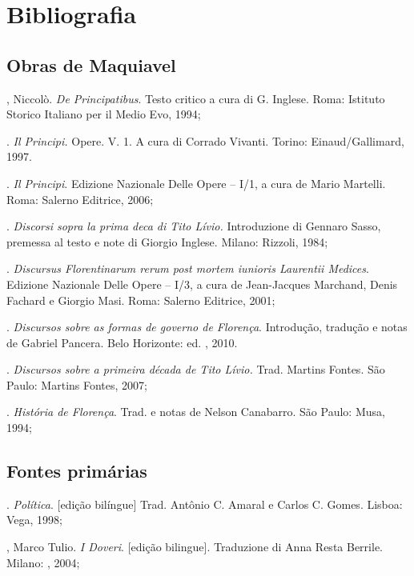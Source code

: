 \movetooddpage
{}
\chapter*{Bibliografia}

\begin{bibliohedra}
\section*{Obras de Maquiavel}

, Niccolò. \emph{De Principatibus}. Testo critico a cura di
G. Inglese. Roma: Istituto Storico Italiano per il Medio Evo, 1994;

\titidem. \emph{Il Principi.} Opere. V. 1. A cura di Corrado
Vivanti. Torino: Einaud/Gallimard, 1997.

\titidem. \emph{Il Principi}. Edizione Nazionale Delle Opere
-- I/1, a cura de Mario Martelli. Roma: Salerno Editrice, 2006;

\titidem. \emph{Discorsi sopra la prima deca di Tito Lívio.}
Introduzione di Gennaro Sasso, premessa al testo e note di Giorgio
Inglese. Milano: Rizzoli, 1984;

\titidem. \emph{Discursus Florentinarum rerum post mortem
iunioris Laurentii Medices}. Edizione Nazionale Delle Opere -- I/3, a
cura de Jean-Jacques Marchand, Denis Fachard e Giorgio Masi. Roma:
Salerno Editrice, 2001;

\titidem. \emph{Discursos sobre as formas de governo de
Florença}. Introdução, tradução e notas de Gabriel Pancera. Belo
Horizonte: ed. , 2010.

\titidem. \emph{Discursos sobre a primeira década de Tito
Lívio.} Trad. Martins Fontes. São Paulo: Martins Fontes, 2007;

\titidem. \emph{História de Florença}. Trad. e notas de
Nelson Canabarro. São Paulo: Musa, 1994;

\section*{Fontes primárias}

. \emph{Política}. {[}edição bilíngue{]} Trad. Antônio C.
Amaral e Carlos C. Gomes. Lisboa: Vega, 1998;

, Marco Tulio. \emph{I Doveri}. {[}edição bilingue{]}. Traduzione
di Anna Resta Berrile. Milano: , 2004;


\end{bibliohedra}
